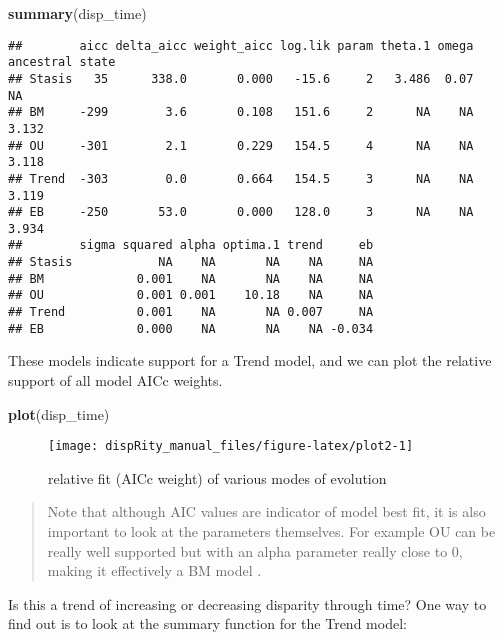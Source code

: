 \documentclass[
]{book}
\newenvironment{Shaded}{\begin{snugshade}}{\end{snugshade}}
\newcommand{\FunctionTok}[1]{\textcolor[rgb]{0.13,0.29,0.53}{\textbf{#1}}}
\newcommand{\NormalTok}[1]{#1}
\begin{document}
\begin{Shaded}
\begin{Highlighting}[]
\FunctionTok{summary}\NormalTok{(disp\_time)}
\end{Highlighting}
\end{Shaded}

\begin{verbatim}
##        aicc delta_aicc weight_aicc log.lik param theta.1 omega ancestral state
## Stasis   35      338.0       0.000   -15.6     2   3.486  0.07              NA
## BM     -299        3.6       0.108   151.6     2      NA    NA           3.132
## OU     -301        2.1       0.229   154.5     4      NA    NA           3.118
## Trend  -303        0.0       0.664   154.5     3      NA    NA           3.119
## EB     -250       53.0       0.000   128.0     3      NA    NA           3.934
##        sigma squared alpha optima.1 trend     eb
## Stasis            NA    NA       NA    NA     NA
## BM             0.001    NA       NA    NA     NA
## OU             0.001 0.001    10.18    NA     NA
## Trend          0.001    NA       NA 0.007     NA
## EB             0.000    NA       NA    NA -0.034
\end{verbatim}

These models indicate support for a Trend model, and we can plot the relative support of all model AICc weights.

\begin{Shaded}
\begin{Highlighting}[]
\FunctionTok{plot}\NormalTok{(disp\_time)}
\end{Highlighting}
\end{Shaded}

\begin{figure}

{\centering \texttt{[image: dispRity\_manual\_files/figure-latex/plot2-1]} 

}

\caption{relative fit (AICc weight) of various modes of evolution}\label{fig:plot2}
\end{figure}

\begin{quote}
Note that although AIC values are indicator of model best fit, it is also important to look at the parameters themselves.
For example OU can be really well supported but with an alpha parameter really close to 0, making it effectively a BM model \citep{Cooper2016}.
\end{quote}

Is this a trend of increasing or decreasing disparity through time? One way to find out is to look at the summary function for the Trend model:
\end{document}
